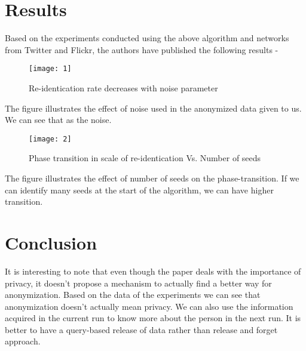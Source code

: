 \documentclass[preprint,12pt]{elsarticle}
\theoremstyle{definition}
\theoremstyle{remark}
\begin{document}
\section{Results}

Based on the experiments conducted using the above algorithm and networks from Twitter and Flickr, the authors have published the following results - 

\begin{figure}[h]
\centering\texttt{[image: 1]}
\caption{Re-identication rate decreases with noise parameter}
\end{figure}

The figure illustrates the effect of noise used in the anonymized data given to us. We can see that as the noise. 

\begin{figure}[h]
\centering\texttt{[image: 2]}
\caption{Phase transition in scale of re-identication Vs. Number of seeds}
\end{figure}

The figure illustrates the effect of number of seeds on the phase-transition. If we can identify many seeds at the start of the algorithm, we can have higher transition.

\section{Conclusion}

It is interesting to note that even though the paper deals with the importance of privacy, it doesn't propose a mechanism to actually find a better way for anonymization. Based on the data of the experiments we can see that anonymization doesn't actually mean privacy. We can also use the information acquired in the current run to know more about the person in the next run. It is better to have a query-based release of data rather than release and forget approach.



\end{document}
